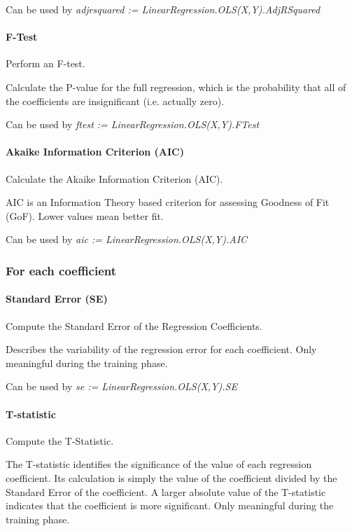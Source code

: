 \documentclass[a4paper,oneside,12pt]{book}
\begin{document}
Can be used by \textit{adjrsquared := LinearRegression.OLS(X,Y).AdjRSquared}

\paragraph{F-Test}

Perform an F-test.

Calculate the P-value for the full regression, which is the probability that all of the coefficients are insignificant (i.e. actually zero).

Can be used by \textit{ftest := LinearRegression.OLS(X,Y).FTest}

\paragraph{Akaike Information Criterion (AIC)}

Calculate the Akaike Information Criterion (AIC).

AIC is an Information Theory based criterion for assessing Goodness of Fit (GoF). Lower values mean better fit.

Can be used by \textit{aic := LinearRegression.OLS(X,Y).AIC}

\subsubsection{For each coefficient}

\paragraph{Standard Error (SE)}

Compute the Standard Error of the Regression Coefficients. 

Describes the variability of the regression error for each coefficient. Only meaningful during the training phase.

Can be used by \textit{se := LinearRegression.OLS(X,Y).SE}

\paragraph{T-statistic}

Compute the T-Statistic.

The T-statistic identifies the significance of the value of each regression coefficient. Its calculation is simply the value of the coefficient divided by the Standard Error of the coefficient. A larger absolute value of the T-statistic indicates that the coefficient is more significant. Only meaningful during the training phase.
\end{document}
